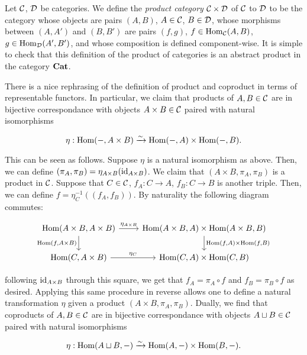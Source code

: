 \begin{defn} Let ${\mathcal C}$, ${\mathcal D}$ be categories. We define the {\em product category} ${\mathcal C}\times {\mathcal D}$ of ${\mathcal C}$ to ${\mathcal D}$ to be the category whose objects are pairs $(A,B)$, $A\in {\mathcal C}$, $B\in {\mathcal D}$, whose morphisms between $(A,A')$ and $(B,B')$ are pairs $(f,g)$, $f\in \operatorname{Hom}_{{\mathcal C}}(A,B)$, $g\in \operatorname{Hom}_{{\mathcal D}}(A',B')$, and whose composition is defined component-wise. It is simple to check that this definition of the product of categories is an abstract product in the category ${\bf Cat}$.
\end{defn}

\begin{ex} There is a nice rephrasing of the definition of product and coproduct in terms of representable functors. In particular, we claim that products of $A,B\in {\mathcal C}$ are in bijective correspondance with objects $A\times B\in {\mathcal C}$ paired with natural isomorphisms

$$\eta:\operatorname{Hom}(-,A\times B)\xrightarrow{\sim}\operatorname{Hom}(-,A)\times\operatorname{Hom}(-,B).$$

This can be seen as follows. Suppose $\eta$ is a natural isomorphism as above. Then, we can define $(\pi_A,\pi_B)=\eta_{A\times B}(\operatorname{id}_{A\times B})$. We claim that $(A\times B,\pi_A,\pi_B)$ is a product in ${\mathcal C}$. Suppose that $C\in {\mathcal C}$, $f_A:C\to A$, $f_B:C\to B$ is another triple. Then, we can define $f=\eta_{C}^{-1}((f_A,f_B))$. By naturality the following diagram commutes:

\[\begin{tikzcd}
	{\Hom(A\times B,A\times B)} & {\Hom(A\times B,A)\times \Hom(A\times B,B)} \\
	{\Hom(C,A\times B)} & {\Hom(C,A)\times\Hom(C,B)}
	\arrow["{\eta_{A\times B}}", from=1-1, to=1-2]
	\arrow["{\Hom(f,A\times B)}"', from=1-1, to=2-1]
	\arrow["{\Hom(f,A)\times\Hom(f,B)}", from=1-2, to=2-2]
	\arrow["{\eta_C}", from=2-1, to=2-2]
\end{tikzcd}\]

following $\operatorname{id}_{A\times B}$ through this square, we get that $f_A=\pi_A\circ f$ and $f_B=\pi_B\circ f$ as desired. Applying this same procedure in reverse allows one to define a natural transformation $\eta$ given a product $(A\times B,\pi_A,\pi_B)$. Dually, we find that coproducts of $A,B\in {\mathcal C}$ are in bijective correspondance with objects $A\sqcup B\in {\mathcal C}$ paired with natural isomorphisms

$$\eta:\operatorname{Hom}(A\sqcup B,-)\xrightarrow{\sim}\operatorname{Hom}(A,-)\times\operatorname{Hom}(B,-).$$
\end{ex}


